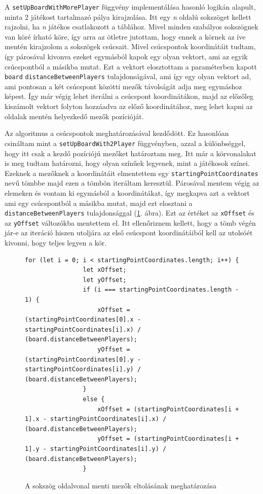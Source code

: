 \documentclass[a4paper,twoside]{article}
\begin{document}
A \verb|setUpBoardWithMorePlayer| függvény implementálása hasonló logikán alapult, minta 2 játékost tartalmazó pálya kirajzolása. Itt egy \textit{n} oldalú sokszöget kellett rajzolni, ha \textit{n} játékos csatlakozott a táblához. Mivel minden szabályos sokszögnek van köré írható köre, így arra az ötletre jutottam, hogy ennek a körnek az íve mentén kirajzolom a sokszögek csúcsait. Mivel csúcspontok koordinátáit tudtam, így párosával kivonva ezeket egymásból kapok egy olyan vektort, ami az egyik csúcspontból a másikba mutat. Ezt a vektort elosztottam a paraméterben kapott \verb|board| \verb|distanceBetweenPlayers| tulajdonságával, ami így egy olyan vektort ad, ami pontosan a két csúcspont közötti mezők távolságát adja meg egymáshoz képest. Így már végig lehet iterálni a csúcspont koordinátákon, majd az előzőleg kiszámolt vektort folyton hozzáadva az előző koordinátához, meg lehet kapni az oldalak mentén helyezkedő mezők pozícióját.
 
Az algoritmus a csúcspontok meghatározásával kezdődött. Ez hasonlóan csináltam mint a \verb|setUpBoardWith2Player| függvényben, azzal a különbséggel, hogy itt csak a kezdő pozíciójú mezőket határoztam meg. Itt már a körvonalakat is meg tudtam határozni, hogy olyan színűek legyenek, mint a játékosok színei. Ezeknek a mezőknek a koordinátáit elmentettem egy \texttt{startingPointCoordinat\-es} nevű tömbbe majd ezen a tömbön iteráltam keresztül. Párosával mentem végig az elemeken és vontam ki egymásból a koordinátákat, így megkapva azt a vektort ami egy csúcspontból a másikba mutat, majd ezt elosztani a \verb|distanceBetweenPlayers| tulajdonsággal (\ref{xOffsetMeghat}. ábra). Ezt az értéket az \verb|xOffset| és az \verb|yOffset| változókba mentettem el. Itt ellenőriznem kellett, hogy a tömb végén jár-e az iteráció hiszen utoljára az első csúcspont koordinátáiból kell az utolsóét kivonni, hogy teljes legyen a kör. 
 
\begin{figure}
	\caption{A sokszög oldalvonal menti mezők eltolásának meghatározása}
	\begin{minipage}{\textwidth}
		\begin{lstlisting}[style=javascriptStyle]
			    for (let i = 0; i < startingPointCoordinates.length; i++) {
				let xOffset;
				let yOffset;
				if (i === startingPointCoordinates.length - 1) {
					xOffset = (startingPointCoordinates[0].x - startingPointCoordinates[i].x) / (board.distanceBetweenPlayers);
					yOffset = (startingPointCoordinates[0].y - startingPointCoordinates[i].y) / (board.distanceBetweenPlayers);
				}
				else {
					xOffset = (startingPointCoordinates[i + 1].x - startingPointCoordinates[i].x) / (board.distanceBetweenPlayers);
					yOffset = (startingPointCoordinates[i + 1].y - startingPointCoordinates[i].y) / (board.distanceBetweenPlayers);
				}
		\end{lstlisting}
	\end{minipage}
	
	\label{xOffsetMeghat}
\end{figure}
\FloatBarrier
\end{document}
